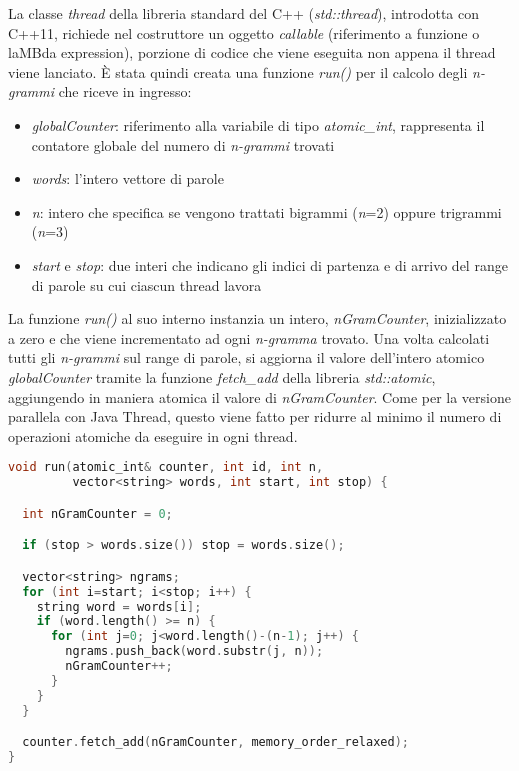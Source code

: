 \documentclass[10pt,twocolumn,letterpaper]{article}
\begin{document}
La classe \textit{thread} della libreria standard del C++ (\textit{std::thread}), introdotta con C++11, richiede nel costruttore un oggetto \textit{callable} (riferimento a funzione o laMBda expression), porzione di codice che viene eseguita non appena il thread viene lanciato.
È stata quindi creata una funzione \textit{run()} per il calcolo degli \textit{n-grammi} che riceve in ingresso:
\begin{itemize}
	\item \textit{globalCounter}: riferimento alla variabile di tipo \textit{atomic\_int}, rappresenta il contatore globale del numero di \textit{n-grammi} trovati
	\item \textit{words}: l'intero vettore di parole
	\item \textit{n}: intero che specifica se vengono trattati bigrammi (\textit{n}=2) oppure trigrammi (\textit{n}=3)
	\item \textit{start} e \textit{stop}: due interi che indicano gli indici di partenza e di arrivo del range di parole su cui ciascun thread lavora
\end{itemize}

La funzione \textit{run()} al suo interno instanzia un intero, \textit{nGramCounter}, inizializzato a zero e che viene incrementato ad ogni \textit{n-gramma} trovato. Una volta calcolati tutti gli \textit{n-grammi} sul range di parole, si aggiorna il valore dell'intero atomico \textit{globalCounter} tramite la funzione \textit{fetch\_add} della libreria \textit{std::atomic}, aggiungendo in maniera atomica il valore di \textit{nGramCounter}. Come per la versione parallela con Java Thread, questo viene fatto per ridurre al minimo il numero di operazioni atomiche da eseguire in ogni thread.\newline

\begin{lstlisting}[basicstyle=\scriptsize, language=C++, frame=single, caption={Esempio di funzione lanciata da un thread in C++},captionpos=b,showstringspaces=false]
void run(atomic_int& counter, int id, int n,
         vector<string> words, int start, int stop) {

  int nGramCounter = 0;

  if (stop > words.size()) stop = words.size();

  vector<string> ngrams;
  for (int i=start; i<stop; i++) {
    string word = words[i];
    if (word.length() >= n) {
      for (int j=0; j<word.length()-(n-1); j++) {
        ngrams.push_back(word.substr(j, n));
        nGramCounter++;
      }
    }
  }

  counter.fetch_add(nGramCounter, memory_order_relaxed);
}
\end{lstlisting}
\end{document}
